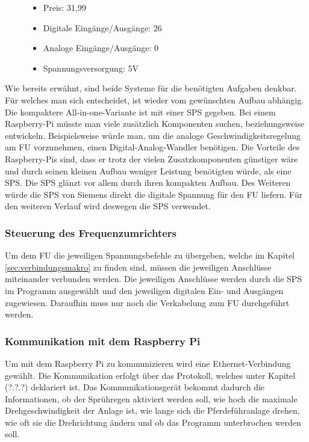 \begin{figure}[H]
\begin{minipage}[t]{0.45\textwidth}
\begin{itemize}
	\item{Preis: 31,99\textsf{\texteuro} \cite{preisRPI}}
	\item{Digitale Eingänge/Ausgänge: 26}
	\item{Analoge Eingänge/Ausgänge: 0}
	\item{Spannungsversorgung: 5V}
\end{itemize}
\end{minipage}
\end{figure}

Wie bereits erwähnt, sind beide Systeme für die benötigten Aufgaben denkbar. Für welches man sich entscheidet, ist wieder vom gewünschten Aufbau abhängig. Die kompaktere All-in-one-Variante ist mit einer \ac{SPS} gegeben. Bei einem Raspberry-Pi müsste man viele zusätzlich Komponenten suchen, beziehungsweise entwickeln. Beispielsweise würde man, um die analoge Geschwindigkeitsregelung am \ac{FU} vorzunehmen, einen Digital-Analog-Wandler benötigen. Die Vorteile des Raspberry-Pis sind, dass er trotz der vielen Zusatzkomponenten günstiger wäre und durch seinen kleinen Aufbau weniger Leistung benötigten würde, als eine \acl{SPS}. Die \ac{SPS} glänzt vor allem durch ihren kompakten Aufbau. Des Weiteren würde die \ac{SPS} von Siemens direkt die digitale Spannung für den \ac{FU} liefern. Für den weiteren Verlauf wird deswegen die \acl{SPS} verwendet. 

\subsubsection{Steuerung des Frequenzumrichters}
\label{sec:steuerungFU}

Um dem \acl{FU} die jeweiligen Spannungsbefehle zu übergeben, welche im Kapitel \ref{sec:verbindungsmakro} zu finden sind, müssen die jeweiligen Anschlüsse miteinander verbunden werden. Die jeweiligen Anschlüsse werden durch die \ac{SPS} im Programm ausgewählt und den jeweiligen digitalen Ein- und Ausgängen zugewiesen. Daraufhin muss nur noch die Verkabelung zum \ac{FU} durchgeführt werden.  

\subsubsection{Kommunikation mit dem Raspberry Pi}
\label{sec:kommunikationZuRaspberry}


Um mit dem Raspberry Pi zu kommunizieren wird eine Ethernet-Verbindung gewählt. Die Kommunikation erfolgt über das Protokoll, welches unter Kapitel (?.?.?) deklariert ist. Das Kommunikationsgerät bekommt dadurch die Informationen, ob der Sprühregen aktiviert werden soll, wie hoch die maximale Drehgeschwindigkeit der Anlage ist, wie lange sich die Pferdeführanlage drehen, wie oft sie die Drehrichtung ändern und ob das Programm unterbrochen werden soll.

